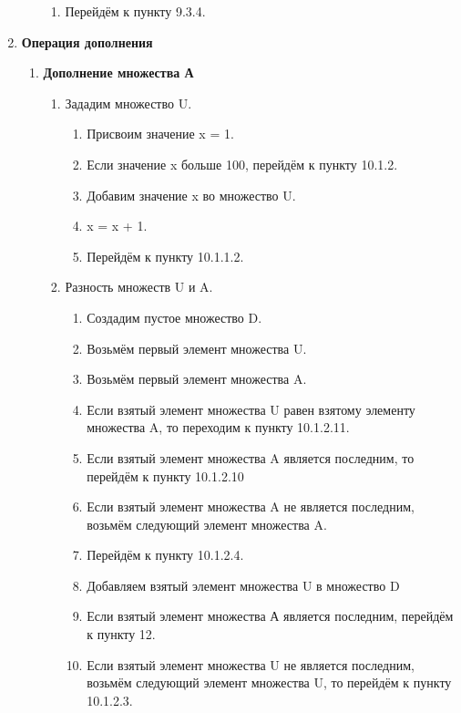 \documentclass[a4paper,12pt]{extarticle}
\begin{document}
\begin{enumerate}
\begin{enumerate}[label*=\arabic*.]
\begin{enumerate}[label*=\arabic*.]
      \item Перейдём к пункту 9.3.4.
    \end{enumerate}
  \end{enumerate}
  \item \textbf{Операция дополнения}
  \begin{enumerate}[label*=\arabic*.]
    \item \textbf{Дополнение множества А}
    \begin{enumerate}[label*=\arabic*.]
      \item Зададим множество U.
      \begin{enumerate}[label*=\arabic*.]
        \item Присвоим значение x = 1.
        \item Если значение x больше 100, перейдём к пункту 10.1.2.
        \item Добавим значение x во множество U.
        \item x = x + 1.
        \item Перейдём к пункту 10.1.1.2.
      \end{enumerate}
      \item Разность множеств U и A.
      \begin{enumerate}[label*=\arabic*.]
        \item Создадим пустое множество D.
        \item Возьмём первый элемент множества U.
        \item Возьмём первый элемент множества A.
        \item Если взятый элемент множества U равен взятому элементу множества A, то переходим к пункту 10.1.2.11.
        \item Если взятый элемент множества A является последним, то перейдём к пункту 10.1.2.10
        \item Если взятый элемент множества A не является последним, возьмём следующий элемент множества A.
        \item Перейдём к пункту 10.1.2.4.
        \item Добавляем взятый элемент множества U в множество D
        \item Если взятый элемент множества А является последним, перейдём к пункту 12.
        \item Если взятый элемент множества U не является последним, возьмём следующий элемент множества U, то перейдём к пункту 10.1.2.3.
      \end{enumerate}
    \end{enumerate}

\end{enumerate}
\end{enumerate}
\end{document}
